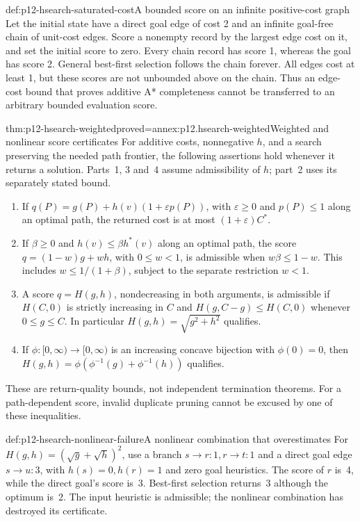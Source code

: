 \begin{hbexample}{def:p12-hsearch-saturated-cost}{A bounded score on an infinite positive-cost graph}
Let the initial state have a direct goal edge of cost 2 and an infinite
goal-free chain of unit-cost edges. Score a nonempty record by the
largest edge cost on it, and set the initial score to zero. Every chain
record has score 1, whereas the goal has score 2. General best-first
selection follows the chain forever. All edges cost at least 1, but
these scores are not unbounded above on the chain. Thus an edge-cost
bound that proves additive A* completeness cannot be transferred to
an arbitrary bounded evaluation score.
\end{hbexample}

\begin{hbtheorem}{thm:p12-hsearch-weighted}{proved=annex:p12.hsearch-weighted}{Weighted and nonlinear score certificates}
For additive costs, nonnegative \(h\), and a search preserving the
needed path frontier, the following assertions hold whenever it returns
a solution. Parts~1, 3 and~4 assume admissibility of \(h\); part~2 uses
its separately stated bound.
\begin{enumerate}
\item If \(q(P)=g(P)+h(v)(1+\varepsilon p(P))\), with
 \(\varepsilon\ge 0\) and \(p(P)\le 1\) along an optimal path,
 the returned cost is at most \((1+\varepsilon)C^*\).
\item If \(\beta\ge 0\) and \(h(v)\le\beta h^*(v)\) along an
 optimal path, the score
 \(q=(1-w)g+wh\), with \(0\le w<1\), is admissible when
 \(w\beta\le 1-w\). This includes
 \(w\le 1/(1+\beta)\), subject to the separate restriction \(w<1\).
\item A score \(q=H(g,h)\), nondecreasing in both arguments, is
 admissible if \(H(C,0)\) is strictly increasing in \(C\) and
 \(H(g,C-g)\le H(C,0)\) whenever \(0\le g\le C\).
 In particular \(H(g,h)=\sqrt{g^2+h^2}\) qualifies.
\item If \(\phi:[0,\infty)\to[0,\infty)\) is an increasing
 concave bijection with \(\phi(0)=0\), then
 \(H(g,h)=\phi(\phi^{-1}(g)+\phi^{-1}(h))\) qualifies.
\end{enumerate}
These are return-quality bounds, not independent termination theorems.
For a path-dependent score, invalid duplicate pruning cannot be excused
by one of these inequalities.
\end{hbtheorem}

\begin{hbexample}{def:p12-hsearch-nonlinear-failure}{A nonlinear combination that overestimates}
For \(H(g,h)=(\sqrt g+\sqrt h)^2\), use a branch
\(s\to r:1,r\to t:1\) and a direct goal edge \(s\to u:3\),
with \(h(s)=0,h(r)=1\) and zero goal heuristics. The score of
\(r\) is~4, while the direct goal's score is~3. Best-first selection
returns~3 although the optimum is~2. The input heuristic is admissible;
the nonlinear combination has destroyed its certificate.
\end{hbexample}

